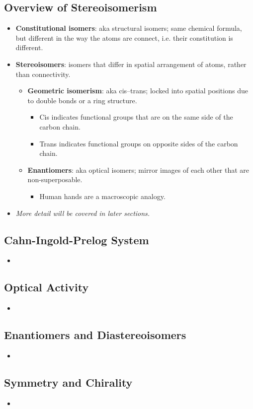 \documentclass[12pt,a4paper]{article}
\begin{document}
\subsection{Overview of Stereoisomerism}
\begin{itemize}
    \item \textbf{Constitutional isomers}: aka structural isomers; same {\color{o-Sun}chemical formula}, but different in the way the {\color{o-Sun}atoms are connect}, i.e. their constitution is different.
    \item \textbf{Stereoisomers}: isomers that differ in {\color{o-Sun}spatial arrangement} of atoms, rather than connectivity.
        \begin{itemize}
            \item \textbf{Geometric isomerism}: aka cis--trans; {\color{o-Sun}locked into spatial positions} due to double bonds or a ring structure.
                \begin{itemize}
                    \item Cis indicates functional groups that are on the same side of the carbon chain.
                    \item Trans indicates functional groups on opposite sides of the carbon chain.
                \end{itemize}
            \item \textbf{Enantiomers}: aka optical isomers; mirror images of each other that are non-superposable.
                \begin{itemize}
                    \item Human hands are a macroscopic analogy.
                \end{itemize}
        \end{itemize}
    \item \textit{More detail will be covered in later sections.}
\end{itemize}

\subsection{Cahn-Ingold-Prelog System}
\begin{itemize}
    \item 
\end{itemize}

\subsection{Optical Activity}
\begin{itemize}
    \item 
\end{itemize}

\subsection{Enantiomers and Diastereoisomers}
\begin{itemize}
    \item 
\end{itemize}

\subsection{Symmetry and Chirality}
\begin{itemize}
    \item 
\end{itemize}


\end{document}
